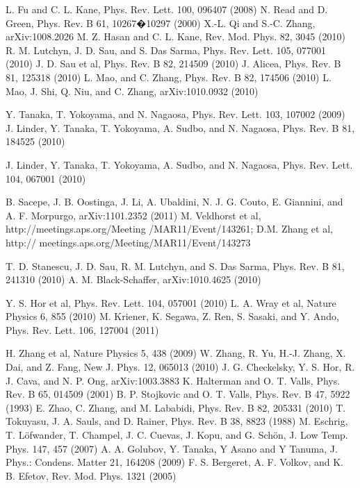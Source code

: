 \documentclass[11pt]{report}
\begin{document}

\begin{thebibliography}{29}
 L. Fu and C. L. Kane,
Phys. Rev. Lett. 100, 096407 (2008)
 N. Read and D. Green, Phys. Rev. B 61, 10267�10297 (2000)
X.-L. Qi and S.-C. Zhang, arXiv:1008.2026
 M. Z. Hasan and C. L. Kane, Rev. Mod. Phys. 82, 3045 (2010)
 R. M. Lutchyn, J. D. Sau, and S. Das Sarma,
Phys. Rev. Lett. 105, 077001 (2010)
 J. D. Sau et al, Phys. Rev. B 82, 214509 (2010)
 J. Alicea, Phys. Rev. B 81, 125318 (2010)
 L. Mao, and C. Zhang, Phys. Rev. B 82, 174506 (2010)
 L. Mao, J. Shi, Q. Niu, and C. Zhang, arXiv:1010.0932 (2010)

 Y. Tanaka, T. Yokoyama, and N. Nagaosa, Phys. Rev. Lett. 103, 107002 (2009)
 J. Linder, Y. Tanaka, T. Yokoyama, A. Sudbo, and N. Nagaosa,
Phys. Rev. B 81, 184525 (2010)

 J. Linder, Y. Tanaka, T. Yokoyama, A. Sudbo, and N. Nagaosa,
 Phys. Rev. Lett. 104, 067001 (2010)

 B. Sacepe, J. B. Oostinga, J. Li, A. Ubaldini, N. J. G. Couto, E. Giannini, and A. F. Morpurgo,
arXiv:1101.2352 (2011)
M. Veldhorst et al, http://meetings.aps.org/Meeting
/MAR11/Event/143261;
D.M. Zhang et al, http://
meetings.aps.org/Meeting/MAR11/Event/143273

T. D. Stanescu, J. D. Sau, R. M. Lutchyn, and S. Das Sarma,
Phys. Rev. B 81, 241310 (2010)
 A. M. Black-Schaffer, arXiv:1010.4625 (2010)

 Y. S. Hor et al, Phys. Rev. Lett. 104, 057001 (2010)
 L. A. Wray et al, Nature Physics 6, 855 (2010)
 M. Kriener, K. Segawa, Z. Ren, S. Sasaki, and Y. Ando,
Phys. Rev. Lett. 106, 127004 (2011)

 H. Zhang et al, Nature Physics 5, 438 (2009)
 W. Zhang, R. Yu, H.-J. Zhang, X. Dai, and Z. Fang, New J. Phys. 12, 065013 (2010)
J. G. Checkelsky, Y. S. Hor, R. J. Cava, and N. P. Ong, arXiv:1003.3883
K. Halterman and O. T. Valls, Phys. Rev. B 65,  014509 (2001)
B. P. Stojkovic and O. T. Valls, Phys. Rev. B 47, 5922 (1993)
E. Zhao, C. Zhang, and M. Lababidi, Phys. Rev. B 82, 205331 (2010) 
T. Tokuyasu, J. A. Sauls, and D. Rainer, Phys. Rev. B 38, 8823 (1988)
M. Eschrig, T. L\"ofwander, T. Champel, J. C. Cuevas, J. Kopu, and G. Sch\"on,
J. Low Temp. Phys. 147, 457 (2007)
A. A. Golubov, Y. Tanaka, Y Asano and Y Tanuma, J. Phys.: Condens. Matter 21, 164208 (2009)
F. S. Bergeret, A. F. Volkov, and K. B. Efetov, Rev. Mod. Phys. 1321 (2005)


\end{thebibliography}
\end{document}
